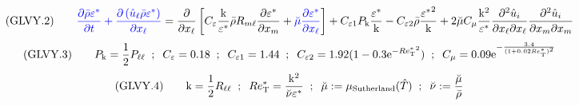 \documentclass{article}
\begin{document}
\begin{equation}
({\rm GLVY}.2)\qquad
{\color{blue}{
\frac{\partial\bar\rho\varepsilon^*}
     {\partial t                   }+\frac{\partial\left(\hat u_\ell\bar\rho\varepsilon^*\right)}
                                          {\partial x_\ell                                        }}}=
\frac{\partial       }
     {\partial x_\ell}\left[C_\varepsilon\frac{\mathrm{k}   }
                                               {\varepsilon^*}\bar\rho R_{m\ell}\frac{\partial\varepsilon^*}
                                                                                     {\partial x_m         }
                           +{\color{blue}{\breve\mu\frac{\partial\varepsilon^*}
                                                        {\partial x_\ell      }}}
                     \right]+C_{\varepsilon 1} P_\mathrm{k}\frac{\varepsilon^*}
                                                                {\mathrm{k}   }
                            -C_{\varepsilon 2}\bar\rho\frac{{\varepsilon^*}^2}{\mathrm{k}}
                            +2 \breve\mu C_{\mu} \frac{{\rm k}^2}{\varepsilon^*} \frac{\partial^2 \hat{u}_i}{\partial x_\ell \partial x_\ell} \frac{\partial^2 \hat{u}_i}{\partial x_m \partial x_m}
\end{equation}
\begin{equation}
({\rm GLVY}.3)\qquad
P_{\rm k} = \frac{1}{2} P_{\ell\ell}\;\; ;\;\;
C_\varepsilon=0.18\;\; ;\;\;
C_{\varepsilon1}=1.44 \;\; ;\;\;
C_{\varepsilon2}=1.92(1-0.3\mathrm{e}^{-{Re^*_{\mathrm{\tiny T}}}^2})\;\; ; \;\;
C_\mu=0.09\mathrm{e}^{-\frac{3.4                    }
                             {(1+0.02 Re^*_{\mathrm{\tiny T}})^2}}
\end{equation}
\begin{equation}
({\rm GLVY}.4)\qquad
\mathrm{k}=\frac{1}{2}R_{\ell\ell}\;\; ; \;\;
Re_{\mathrm{\tiny T}}^* =\frac{\mathrm{k}^2          }
                            {\breve\nu\varepsilon^*}\;\; ; \;\;
\breve\mu:=\mu_{\rm Sutherland}(\hat T)\;\; ; \;\;
\breve\nu:=\frac{\breve\mu}{\bar\rho}
\end{equation}
\end{document}
